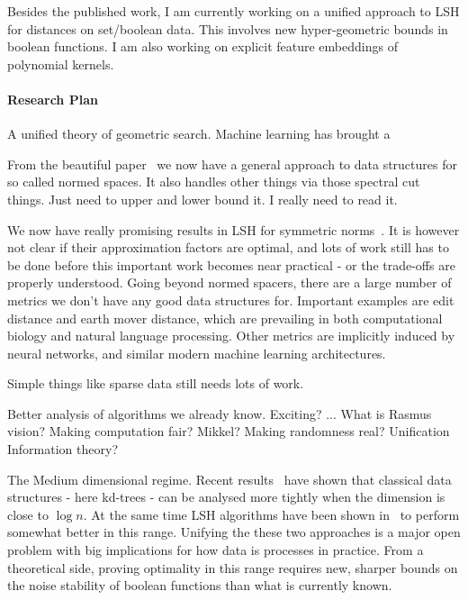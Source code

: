 \documentclass[10pt]{article}
\begin{document}



Besides the published work, I am currently working on a unified approach to LSH for distances on set/boolean data. This involves new hyper-geometric bounds in boolean functions. I am also working on explicit feature embeddings of polynomial kernels.

\paragraph{Research Plan}

A unified theory of geometric search.
Machine learning has brought a 

From the beautiful paper~\cite{andoni2018data} we now have a general approach to data structures for so called normed spaces.
It also handles other things via those spectral cut things.
Just need to upper and lower bound it.
I really need to read it.


We now have really promising results in LSH for symmetric norms~\cite{DBLP:journals/siamcomp/AndoniKR18}.
It is however not clear if their approximation factors are optimal, and lots of work still has to be done before this important work becomes near practical - or the trade-offs are properly understood.
Going beyond normed spacers, there are a large number of metrics we don’t have any good data structures for.
Important examples are edit distance and earth mover distance, which are prevailing in both computational biology and natural language processing.
Other metrics are implicitly induced by neural networks, and similar modern machine learning architectures.

Simple things like sparse data still needs lots of work.


Better analysis of algorithms we already know. Exciting? ...
What is Rasmus vision? Making computation fair?
Mikkel? Making randomness real?
Unification
Information theory?

The Medium dimensional regime.
Recent results~\cite{DBLP:conf/compgeom/Chan17a} have shown that classical data structures - here kd-trees - can be analysed more tightly when the dimension is close to $\log n$.
At the same time LSH algorithms have been shown in~\cite{becker2016new} to perform somewhat better in this range.
Unifying the these two approaches is a major open problem with big implications for how data is processes in practice.
From a theoretical side, proving optimality in this range requires new, sharper bounds on the noise stability of boolean functions than what is currently known.
\end{document}
